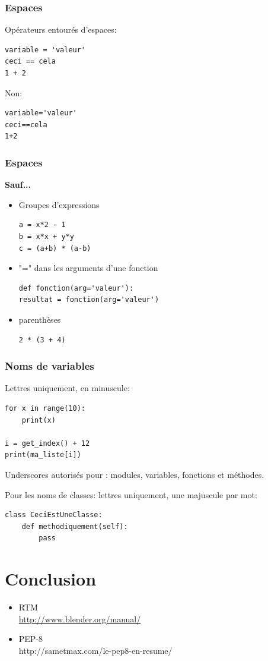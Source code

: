 \documentclass[11pt,usenames,dvipsnames]{beamer}
\begin{document}
\begin{frame}[fragile]
  \frametitle{Espaces}
  Opérateurs entourés d'espaces:
  \begin{lstlisting}[showspaces=true]
variable = 'valeur'
ceci == cela
1 + 2
  \end{lstlisting}
  
Non:
\begin{lstlisting}[showspaces=true]
variable='valeur'
ceci==cela
1+2
\end{lstlisting}
\end{frame}

\begin{frame}[fragile]
  \frametitle{Espaces}
  \textbf{Sauf...}
  
  \begin{itemize}
    \item Groupes d'expressions
    \begin{lstlisting}[showspaces=true]
a = x*2 - 1
b = x*x + y*y
c = (a+b) * (a-b)
\end{lstlisting}
    \item "=" dans les arguments d'une fonction
    \begin{lstlisting}[showspaces=true]
def fonction(arg='valeur'):
resultat = fonction(arg='valeur')
\end{lstlisting}
    \item parenthèses
    \begin{lstlisting}[showspaces=true]
2 * (3 + 4)
\end{lstlisting}
  \end{itemize}
\end{frame}

\begin{frame}[fragile]
  \frametitle{Noms de variables}
  Lettres uniquement, en minuscule:
  \begin{lstlisting}
for x in range(10):
    print(x)
 
i = get_index() + 12
print(ma_liste[i])
  \end{lstlisting}
  Underscores autorisés pour : modules, variables, fonctions et méthodes.
  
  \bigskip
  
  Pour les noms de classes: lettres uniquement, une majuscule par mot:
  \begin{lstlisting}
class CeciEstUneClasse:
    def methodiquement(self):
        pass
  \end{lstlisting}
\end{frame}


\section{Conclusion}
\begin{frame}
  \begin{itemize}
    \item RTM\\
          \url{http://www.blender.org/manual/}
    \item PEP-8\\
          http://sametmax.com/le-pep8-en-resume/
  \end{itemize}
\end{frame}
\end{document}
